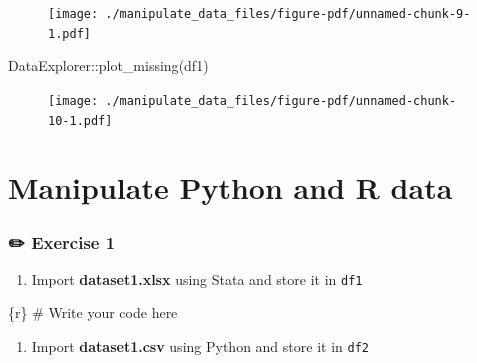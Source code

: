 \documentclass[
  letterpaper,
  DIV=11,
  numbers=noendperiod,
  oneside]{scrreprt}
\newenvironment{Shaded}{\begin{snugshade}}{\end{snugshade}}
\newcommand{\CommentTok}[1]{\textcolor[rgb]{0.37,0.37,0.37}{#1}}
\newcommand{\FunctionTok}[1]{\textcolor[rgb]{0.28,0.35,0.67}{#1}}
\newcommand{\InformationTok}[1]{\textcolor[rgb]{0.37,0.37,0.37}{#1}}
\newcommand{\NormalTok}[1]{\textcolor[rgb]{0.00,0.23,0.31}{#1}}
\newcommand{\SpecialCharTok}[1]{\textcolor[rgb]{0.37,0.37,0.37}{#1}}
\providecommand{\tightlist}{%
  \setlength{\itemsep}{0pt}\setlength{\parskip}{0pt}}\usepackage{longtable,booktabs,array}
\begin{document}
\begin{figure}[H]

{\centering \texttt{[image: ./manipulate\_data\_files/figure-pdf/unnamed-chunk-9-1.pdf]}

}

\end{figure}

\begin{Shaded}
\begin{Highlighting}[]
\NormalTok{DataExplorer}\SpecialCharTok{::}\FunctionTok{plot\_missing}\NormalTok{(df1)}
\end{Highlighting}
\end{Shaded}

\begin{figure}[H]

{\centering \texttt{[image: ./manipulate\_data\_files/figure-pdf/unnamed-chunk-10-1.pdf]}

}

\end{figure}

\hypertarget{manipulate-python-and-r-data}{%
\section{Manipulate Python and R
data}\label{manipulate-python-and-r-data}}

\hypertarget{exercise-1-2}{%
\subsubsection{\texorpdfstring{{✏️} Exercise
1}{✏️ Exercise 1}}\label{exercise-1-2}}

\begin{enumerate}
\def\labelenumi{\arabic{enumi}.}
\tightlist
\item
  Import \textbf{dataset1.xlsx} using Stata and store it in \texttt{df1}
\end{enumerate}

\begin{Shaded}
\begin{Highlighting}[]
\InformationTok{\textasciigrave{}\textasciigrave{}\textasciigrave{}\{r\}}
\CommentTok{\# Write your code here}
\InformationTok{\textasciigrave{}\textasciigrave{}\textasciigrave{}}
\end{Highlighting}
\end{Shaded}

\begin{enumerate}
\def\labelenumi{\arabic{enumi}.}
\setcounter{enumi}{1}
\tightlist
\item
  Import \textbf{dataset1.csv} using Python and store it in \texttt{df2}
\end{enumerate}
\end{document}
